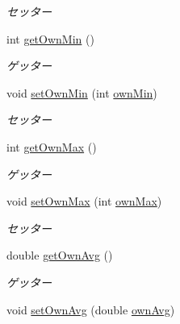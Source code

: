 \begin{DoxyCompactItemize}
\begin{DoxyCompactList}\small\item\em セッター \end{DoxyCompactList}\item 
int \hyperlink{classjp_1_1gr_1_1java__conf_1_1yuta__yoshinaga_1_1reversi_1_1model_1_1_reversi_anz_a680562962d38f2056d67402b39b428f7}{get\+Own\+Min} ()
\begin{DoxyCompactList}\small\item\em ゲッター \end{DoxyCompactList}\item 
void \hyperlink{classjp_1_1gr_1_1java__conf_1_1yuta__yoshinaga_1_1reversi_1_1model_1_1_reversi_anz_a992c733f3daddc0eb780618fc2925d5d}{set\+Own\+Min} (int \hyperlink{classjp_1_1gr_1_1java__conf_1_1yuta__yoshinaga_1_1reversi_1_1model_1_1_reversi_anz_aaeac4de92234a35a56b90a4777d21f6b}{own\+Min})
\begin{DoxyCompactList}\small\item\em セッター \end{DoxyCompactList}\item 
int \hyperlink{classjp_1_1gr_1_1java__conf_1_1yuta__yoshinaga_1_1reversi_1_1model_1_1_reversi_anz_a4d6b0409eb65f3c6b4f34989c504daa9}{get\+Own\+Max} ()
\begin{DoxyCompactList}\small\item\em ゲッター \end{DoxyCompactList}\item 
void \hyperlink{classjp_1_1gr_1_1java__conf_1_1yuta__yoshinaga_1_1reversi_1_1model_1_1_reversi_anz_a081ca00af199ce00ac6970019471c472}{set\+Own\+Max} (int \hyperlink{classjp_1_1gr_1_1java__conf_1_1yuta__yoshinaga_1_1reversi_1_1model_1_1_reversi_anz_a808e4479311042e9a2917b613ad4a124}{own\+Max})
\begin{DoxyCompactList}\small\item\em セッター \end{DoxyCompactList}\item 
double \hyperlink{classjp_1_1gr_1_1java__conf_1_1yuta__yoshinaga_1_1reversi_1_1model_1_1_reversi_anz_ac4f81a2452f38fa4078195aa970527fb}{get\+Own\+Avg} ()
\begin{DoxyCompactList}\small\item\em ゲッター \end{DoxyCompactList}\item 
void \hyperlink{classjp_1_1gr_1_1java__conf_1_1yuta__yoshinaga_1_1reversi_1_1model_1_1_reversi_anz_a61cdd5fd8811fdfb3b91ec0deee28e00}{set\+Own\+Avg} (double \hyperlink{classjp_1_1gr_1_1java__conf_1_1yuta__yoshinaga_1_1reversi_1_1model_1_1_reversi_anz_abe0fb03d62766e18f3875731255232c2}{own\+Avg})

\end{DoxyCompactItemize}
